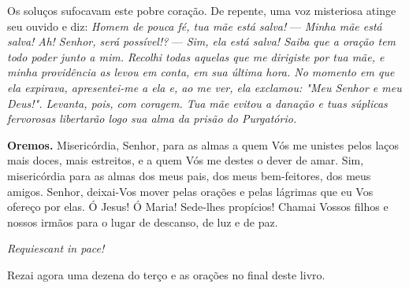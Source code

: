 Os soluços sufocavam este pobre coração. De repente, uma voz misteriosa atinge seu ouvido e diz: \textit{Homem de pouca fé, tua mãe está salva!} --- \textit{Minha mãe está salva! Ah! Senhor, será possível!?} --- \textit{Sim, ela está salva! Saiba que a oração tem todo poder junto a mim. Recolhi todas aquelas que me dirigiste por tua mãe, e minha providência as levou em conta, em sua última hora. No momento em que ela expirava, apresentei-me a ela e, ao me ver, ela exclamou: "Meu Senhor e meu Deus!". Levanta, pois, com coragem. Tua mãe evitou a danação e tuas súplicas fervorosas libertarão logo sua alma da prisão do Purgatório.}


\vspace{\baselineskip}\noindent \textbf{Oremos.} Misericórdia, Senhor, para as almas a quem Vós me unistes pelos laços mais doces, mais estreitos, e a quem Vós me destes o dever de amar. Sim, misericórdia para as almas dos meus pais, dos meus bem-feitores, dos meus amigos. Senhor, deixai-Vos mover pelas orações e pelas lágrimas que eu Vos ofereço por elas. Ó Jesus! Ó Maria! Sede-lhes propícios! Chamai Vossos filhos e nossos irmãos para o lugar de descanso, de luz e de paz.



\begin{center}
\textit{Requiescant in pace!}
\end{center}

Rezai agora uma dezena do terço e as orações no final deste livro.

